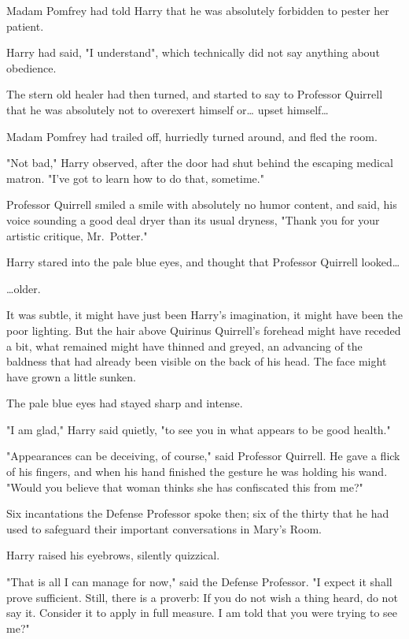 Madam Pomfrey had told Harry that he was absolutely forbidden to pester her 
patient.

Harry had said, "I understand", which technically did not say anything about 
obedience.

The stern old healer had then turned, and started to say to Professor Quirrell 
that he was absolutely not to overexert himself or{\ldots} upset himself{\ldots}

Madam Pomfrey had trailed off, hurriedly turned around, and fled the room.

"Not bad," Harry observed, after the door had shut behind the escaping medical 
matron. "I've got to learn how to do that, sometime."

Professor Quirrell smiled a smile with absolutely no humor content, and said, 
his voice sounding a good deal dryer than its usual dryness, "Thank you for 
your artistic critique, Mr.~Potter."

Harry stared into the pale blue eyes, and thought that Professor Quirrell 
looked{\ldots}

{\ldots}older.

It was subtle, it might have just been Harry's imagination, it might have been 
the poor lighting. But the hair above Quirinus Quirrell's forehead might have 
receded a bit, what remained might have thinned and greyed, an advancing of the 
baldness that had already been visible on the back of his head. The face might 
have grown a little sunken.

The pale blue eyes had stayed sharp and intense.

"I am glad," Harry said quietly, "to see you in what appears to be good health."

"Appearances can be deceiving, of course," said Professor Quirrell. He gave a 
flick of his fingers, and when his hand finished the gesture he was holding his 
wand. "Would you believe that woman thinks she has confiscated this from me?"

Six incantations the Defense Professor spoke then; six of the thirty that he 
had used to safeguard their important conversations in Mary's Room.

Harry raised his eyebrows, silently quizzical.

"That is all I can manage for now," said the Defense Professor. "I expect it 
shall prove sufficient. Still, there is a proverb: If you do not wish a thing 
heard, do not say it. Consider it to apply in full measure. I am told that you 
were trying to see me?"

